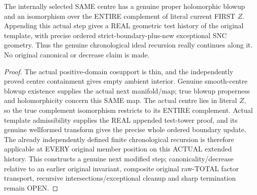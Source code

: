 \begin{theorem}
\label{hir:sharp-original-actual-dynamic-distinct-next-blowup}
\leanok
The internally selected SAME centre has a genuine proper holomorphic
blowup and an isomorphism over the ENTIRE complement of literal current
FIRST $Z$. Appending this actual step gives a REAL geometric test history
of the original template, with precise ordered strict-boundary-plus-new
exceptional SNC geometry. Thus the genuine chronological ideal recursion
really continues along it. No original canonical or decrease claim is made.
\end{theorem}
\begin{proof}
The actual positive-domain cosupport is thin, and the independently proved
centre containment gives empty ambient interior. Genuine smooth-centre
blowup existence supplies the actual next manifold/map; true blowup
properness and holomorphicity concern this SAME map. The actual centre
lies in literal $Z$, so the true complement isomorphism restricts to its
ENTIRE complement. Actual template admissibility supplies the REAL appended
test-tower proof, and its genuine wellformed transform gives the precise
whole ordered boundary update. The already independently defined finite
chronological recursion is therefore applicable at EVERY original member
position on this ACTUAL extended history. This constructs a genuine next
modified step; canonicality/decrease relative to an earlier original
invariant, composite original raw-TOTAL factor transport, recursive
intersections/exceptional cleanup and sharp termination remain OPEN.
\end{proof}
